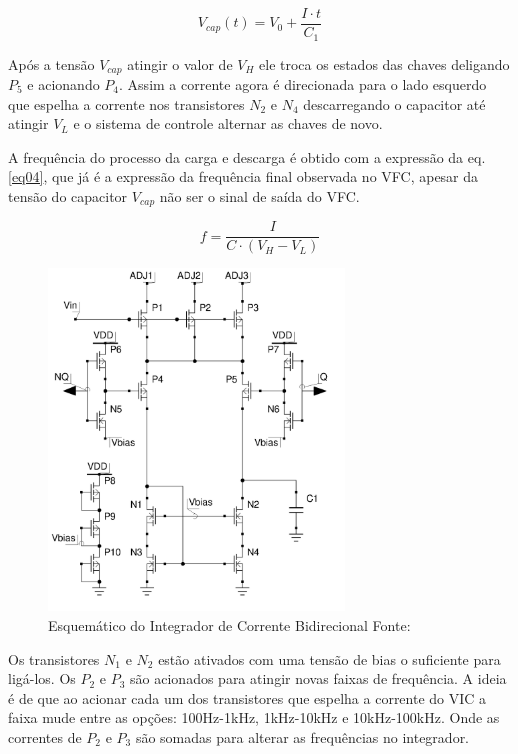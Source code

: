 \begin{equation}
V_{cap}(t) = V_0 + \frac{I\cdot t}{C_1}
 \label{eq03}
\end{equation}

Após a tensão $V_{cap}$ atingir o valor de $V_H$ ele troca os estados das chaves deligando $P_5$ e acionando $P_4$. 
Assim a corrente agora é direcionada para o lado esquerdo que espelha a corrente nos transistores $N_2$ e $N_4$ descarregando o capacitor até atingir $V_L$ e o sistema de controle alternar as chaves de novo.  


A frequência do processo da carga e descarga é obtido com a expressão da eq. \ref{eq04}, que já é a expressão da frequência final observada no VFC, apesar da tensão do capacitor $V_{cap}$ não ser o sinal de saída do VFC. 

\begin{equation}
f = \frac{I}{C\cdot(V_H - V_L)}
 \label{eq04}
\end{equation}

\begin{figure}[htb]
	\centering
	\includegraphics[width=0.7\textwidth]{figuras/integrate.png}
	\caption{Esquemático do Integrador de Corrente Bidirecional Fonte:\cite{artigo_tag_unb} }
	\label{fig09}
\end{figure}

Os transistores $N_1$ e $N_2$ estão ativados com uma tensão de bias o suficiente para ligá-los. Os $P_2$ e $P_3$ são acionados para atingir novas faixas de frequência. A ideia é de que ao acionar cada um dos transistores que espelha a corrente do VIC a faixa mude entre as opções: 100Hz-1kHz, 1kHz-10kHz e 10kHz-100kHz. Onde as correntes de $P_2$ e $P_3$  são somadas para alterar as frequências no integrador.

